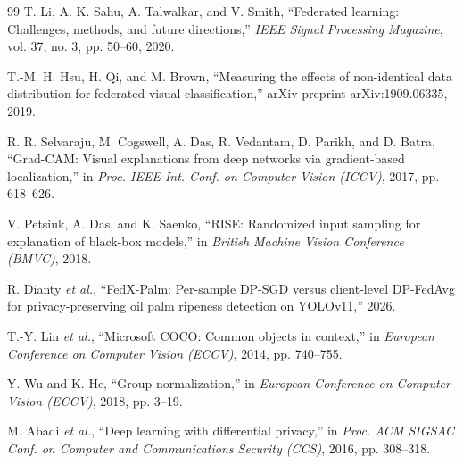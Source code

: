 \documentclass[9pt,twocolumn]{extarticle}
\begin{document}
\begin{thebibliography}{99}
 T. Li, A. K. Sahu, A. Talwalkar, and V. Smith, ``Federated learning: Challenges, methods, and future directions,'' \emph{IEEE Signal Processing Magazine}, vol. 37, no. 3, pp. 50--60, 2020.

 T.-M. H. Hsu, H. Qi, and M. Brown, ``Measuring the effects of non-identical data distribution for federated visual classification,'' arXiv preprint arXiv:1909.06335, 2019.

 R. R. Selvaraju, M. Cogswell, A. Das, R. Vedantam, D. Parikh, and D. Batra, ``Grad-CAM: Visual explanations from deep networks via gradient-based localization,'' in \emph{Proc. IEEE Int. Conf. on Computer Vision (ICCV)}, 2017, pp. 618--626.

 V. Petsiuk, A. Das, and K. Saenko, ``RISE: Randomized input sampling for explanation of black-box models,'' in \emph{British Machine Vision Conference (BMVC)}, 2018.

 R. Dianty \emph{et al.}, ``FedX-Palm: Per-sample DP-SGD versus client-level DP-FedAvg for privacy-preserving oil palm ripeness detection on YOLOv11,'' 2026.

 T.-Y. Lin \emph{et al.}, ``Microsoft COCO: Common objects in context,'' in \emph{European Conference on Computer Vision (ECCV)}, 2014, pp. 740--755.

 Y. Wu and K. He, ``Group normalization,'' in \emph{European Conference on Computer Vision (ECCV)}, 2018, pp. 3--19.

 M. Abadi \emph{et al.}, ``Deep learning with differential privacy,'' in \emph{Proc. ACM SIGSAC Conf. on Computer and Communications Security (CCS)}, 2016, pp. 308--318.

\end{thebibliography}
\end{document}

